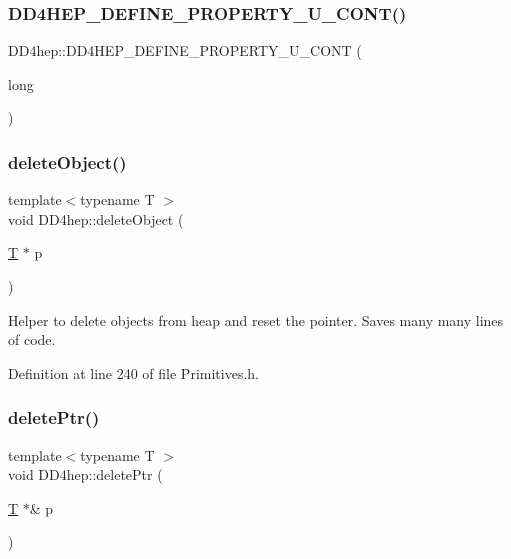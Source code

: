 \subsubsection{\texorpdfstring{D\+D4\+H\+E\+P\+\_\+\+D\+E\+F\+I\+N\+E\+\_\+\+P\+R\+O\+P\+E\+R\+T\+Y\+\_\+\+U\+\_\+\+C\+O\+N\+T()}{DD4HEP\_DEFINE\_PROPERTY\_U\_CONT()}\hspace{0.1cm}{\footnotesize\ttfamily [2/2]}}
{\footnotesize\ttfamily D\+D4hep\+::\+D\+D4\+H\+E\+P\+\_\+\+D\+E\+F\+I\+N\+E\+\_\+\+P\+R\+O\+P\+E\+R\+T\+Y\+\_\+\+U\+\_\+\+C\+O\+NT (\begin{DoxyParamCaption}\item[{long}]{ }\end{DoxyParamCaption})}

\hypertarget{namespace_d_d4hep_ab17a8692fe8e07072174088bb872a67d}{}\label{namespace_d_d4hep_ab17a8692fe8e07072174088bb872a67d} 
\subsubsection{\texorpdfstring{delete\+Object()}{deleteObject()}}
{\footnotesize\ttfamily template$<$typename T $>$ \\
void D\+D4hep\+::delete\+Object (\begin{DoxyParamCaption}\item[{\hyperlink{class_t}{T} $\ast$}]{p }\end{DoxyParamCaption})\hspace{0.3cm}{\ttfamily [inline]}}



Helper to delete objects from heap and reset the pointer. Saves many many lines of code. 



Definition at line 240 of file Primitives.\+h.

\hypertarget{namespace_d_d4hep_a14ac1cc5b1c931da327a5b2ed57fdd85}{}\label{namespace_d_d4hep_a14ac1cc5b1c931da327a5b2ed57fdd85} 
\subsubsection{\texorpdfstring{delete\+Ptr()}{deletePtr()}}
{\footnotesize\ttfamily template$<$typename T $>$ \\
void D\+D4hep\+::delete\+Ptr (\begin{DoxyParamCaption}\item[{\hyperlink{class_t}{T} $\ast$\&}]{p }\end{DoxyParamCaption})\hspace{0.3cm}{\ttfamily [inline]}}



